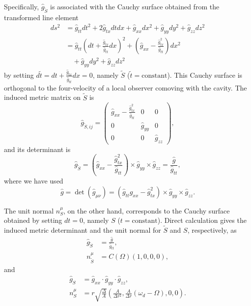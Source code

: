 Specifically, $\hat{g}_{\tilde{S}}$ is associated with the Cauchy surface obtained from the transformed line element 
\begin{equation}
\label{eq:metric}
\begin{aligned}
ds^{2} &=\hat{g}_{tt}dt^{2}+2\hat{g}_{tx}dtdx+\hat{g}_{xx}dx^{2}+\hat{g}_{yy}dy^{2}+\hat{g}_{zz}dz^{2}\\
&=\hat{g}_{tt}\left(dt+\frac{\hat{g}_{tx}}{\hat{g}_{tt}}dx\right)^{2}+\left(\hat{g}_{xx}-\frac{\hat{g}^{2}_{tx}}{\hat{g}_{tt}}\right)dx^{2}\\
&\quad +\hat{g}_{yy}dy^{2}+\hat{g}_{zz}dz^{2}
\end{aligned}
\end{equation}
 by setting $d\tilde{t}=dt+\frac{\hat{g}_{tx}}{\hat{g}_{tt}}dx=0$, namely $\tilde{S}$ ($\tilde{t}=\text{constant}$). This Cauchy surface is orthogonal to the four-velocity of a local observer comoving with the cavity. The induced metric matrix on $\tilde{S}$ is 
\begin{equation}
\label{eq:induced-metric}
\hat{g}_{\tilde{S},ij}=\begin{pmatrix}\hat{g}_{xx}-\frac{\hat{g}^{2}_{tx}}{\hat{g}_{tt}} & 0 & 0\\
0 & \hat{g}_{yy} & 0\\
0 & 0 & \hat{g}_{zz}
\end{pmatrix},
\end{equation}
 and its determinant is 
\begin{equation}
\label{eq:induced-determinant}
\hat{g}_{\tilde{S}}=\left(\hat{g}_{xx}-\frac{\hat{g}^{2}_{tx}}{\hat{g}_{tt}}\right)\times\hat{g}_{yy}\times\hat{g}_{zz}=\frac{\hat{g}}{\hat{g}_{tt}},
\end{equation}
 where we have used 
\begin{equation}
\label{eq:metric-determinant}
\hat{g}=\det\left(\hat{g}_{\mu\nu}\right)=\left(\hat{g}_{tt}\hat{g}_{xx}-\hat{g}^{2}_{tx}\right)\times\hat{g}_{yy}\times\hat{g}_{zz}.
\end{equation}


The unit normal $n^{\mu}_{S}$, on the other hand, corresponds to the Cauchy surface obtained by setting $dt=0$, namely $S$ ($t=\text{constant}$). Direct calculation gives the induced metric determinant and the unit normal for $\tilde{S}$ and $S$, respectively, as 
\begin{equation}
\label{eq:tilde-s-data}
\begin{aligned}
\hat{g}_{\tilde{S}} & =\frac{\hat{g}}{\hat{g}_{tt}},\\
n^{\mu}_{\tilde{S}} & =C\left(\Omega\right)\left(1,0,0,0\right),
\end{aligned}
\end{equation}
 and 
\begin{equation}
\label{eq:s-data}
\begin{aligned}
\hat{g}_{S} & =\hat{g}_{xx}\cdot\hat{g}_{yy}\cdot\hat{g}_{zz},\\
n^{\mu}_{S} & =r\sqrt{\frac{\Delta}{A}}\left(\frac{A}{\Delta r^{2}},\frac{A}{\Delta r}\left(\omega_{d}-\Omega\right),0,0\right).
\end{aligned}
\end{equation}

